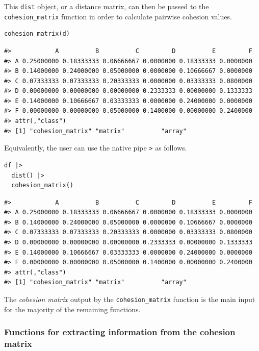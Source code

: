 This \texttt{dist} object, or a distance matrix, can then be passed to the \texttt{cohesion\_matrix} function in order to calculate pairwise cohesion values.

\begin{verbatim}
cohesion_matrix(d)
\end{verbatim}

\begin{verbatim}
#>            A          B          C         D          E         F
#> A 0.25000000 0.18333333 0.06666667 0.0000000 0.18333333 0.0000000
#> B 0.14000000 0.24000000 0.05000000 0.0000000 0.10666667 0.0000000
#> C 0.07333333 0.07333333 0.20333333 0.0000000 0.03333333 0.0800000
#> D 0.00000000 0.00000000 0.00000000 0.2333333 0.00000000 0.1333333
#> E 0.14000000 0.10666667 0.03333333 0.0000000 0.24000000 0.0000000
#> F 0.00000000 0.00000000 0.05000000 0.1400000 0.00000000 0.2400000
#> attr(,"class")
#> [1] "cohesion_matrix" "matrix"          "array"
\end{verbatim}

Equivalently, the user can use the native pipe \texttt{\textbar{}\textgreater{}} as follows.

\begin{verbatim}
df |>
  dist() |>
  cohesion_matrix()
\end{verbatim}

\begin{verbatim}
#>            A          B          C         D          E         F
#> A 0.25000000 0.18333333 0.06666667 0.0000000 0.18333333 0.0000000
#> B 0.14000000 0.24000000 0.05000000 0.0000000 0.10666667 0.0000000
#> C 0.07333333 0.07333333 0.20333333 0.0000000 0.03333333 0.0800000
#> D 0.00000000 0.00000000 0.00000000 0.2333333 0.00000000 0.1333333
#> E 0.14000000 0.10666667 0.03333333 0.0000000 0.24000000 0.0000000
#> F 0.00000000 0.00000000 0.05000000 0.1400000 0.00000000 0.2400000
#> attr(,"class")
#> [1] "cohesion_matrix" "matrix"          "array"
\end{verbatim}

The \emph{cohesion matrix} output by the \texttt{cohesion\_matrix} function is the main input for the majority of the remaining functions.

\hypertarget{functions-for-extracting-information-from-the-cohesion-matrix}{%
\subsubsection{Functions for extracting information from the cohesion matrix}\label{functions-for-extracting-information-from-the-cohesion-matrix}}


